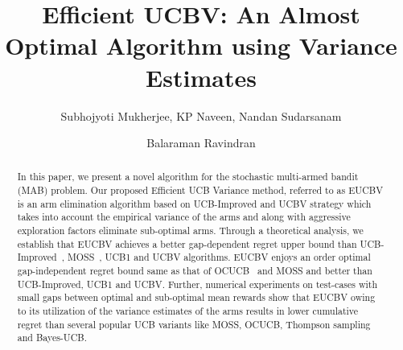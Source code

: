 \documentclass{llncs}
\begin{document}
%
\frontmatter          %
%
\pagestyle{headings}  %

\mainmatter              %
%
\title{Efficient UCBV: An Almost Optimal Algorithm using Variance Estimates}
%
%
\author{Subhojyoti Mukherjee, KP Naveen, Nandan Sudarsanam
 \and Balaraman Ravindran}
%
%
%

\maketitle              %

\begin{abstract}
In this paper, we present a novel algorithm for the stochastic multi-armed bandit (MAB) problem. Our proposed Efficient UCB Variance method, referred to as EUCBV is an arm elimination algorithm based on  UCB-Improved and UCBV strategy which takes into account the empirical variance of the arms and along  with aggressive exploration factors eliminate sub-optimal arms. Through a theoretical analysis, we establish that EUCBV achieves a better gap-dependent regret upper bound than UCB-Improved~\cite{auer2010ucb}, MOSS~\cite{audibert2009minimax}, UCB1 and UCBV algorithms. EUCBV enjoys an order optimal gap-independent regret bound same as that of OCUCB~\cite{lattimore2015optimally} and MOSS and better than UCB-Improved, UCB1 and UCBV. Further, numerical experiments on test-cases with small gaps between optimal and sub-optimal mean rewards show that EUCBV owing to its utilization of the variance estimates of the arms results in lower cumulative regret than several popular UCB variants like MOSS, OCUCB, Thompson sampling and Bayes-UCB\cite{kaufmann2012bayesian}. 

\end{abstract}
\end{document}
